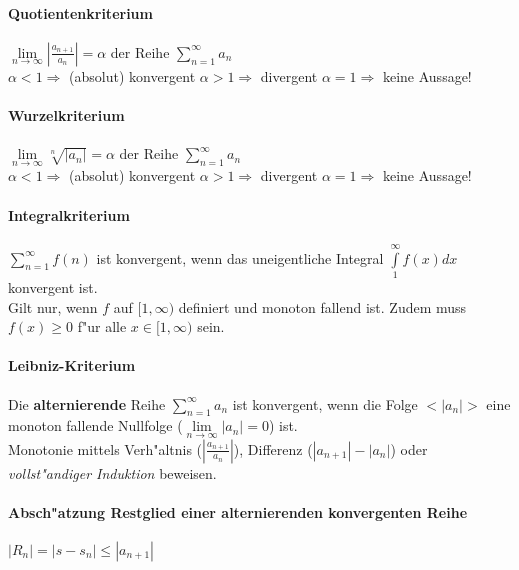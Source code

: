 \paragraph{Quotientenkriterium}
  $ \lim\limits_{n \to \infty} \left|\frac{a_{n+1}}{a_n}\right| = \alpha $ der
Reihe $ \sum\limits_{n=1}^{\infty} a_n $ \\ $\alpha < 1 \Rightarrow$ (absolut) konvergent \hspace{3cm}
  $\alpha > 1 \Rightarrow$ divergent \hspace{4cm} 
  $\alpha = 1 \Rightarrow$ keine Aussage!

\paragraph{Wurzelkriterium}
  $ \lim\limits_{n \to \infty} \sqrt[n]{\left|a_n\right|} = \alpha $ der Reihe $
\sum\limits_{n=1}^{\infty} a_n $ \\ $\alpha < 1 \Rightarrow$ (absolut) konvergent\hspace{3cm}
  $\alpha > 1 \Rightarrow$ divergent \hspace{4cm} 
  $\alpha = 1 \Rightarrow$ keine Aussage!

\paragraph{Integralkriterium}
  $ \sum\limits_{n=1}^{\infty} f(n) $ ist konvergent, wenn das uneigentliche
Integral $ \int\limits_{1}^{\infty} f(x) dx $ konvergent ist. \\ Gilt nur, wenn $f$ auf $ [1, \infty) $ definiert und monoton fallend ist. Zudem muss $ f(x) \geq 0 $ f"ur alle $x \in [1, \infty)$ sein.
 
\paragraph{Leibniz-Kriterium}
  Die \textbf{alternierende} Reihe $ \sum\limits_{n=1}^{\infty} a_n $ ist
  konvergent, wenn die Folge $<\left|a_n\right|>$ eine monoton fallende Nullfolge ($\lim\limits_{n \to \infty} \left|a_n\right| = 0 $) ist. \\ 
  Monotonie mittels Verh"altnis ($ \left|\frac{a_{n+1}}{a_n}\right| $),
  Differenz ($ |a_{n+1}| - |a_n| $) oder \textit{vollst"andiger Induktion} beweisen.\\

\paragraph{Absch"atzung Restglied einer alternierenden konvergenten
  Reihe}\qquad $|R_n| = |s-s_n|\leq |a_{n+1}|$


